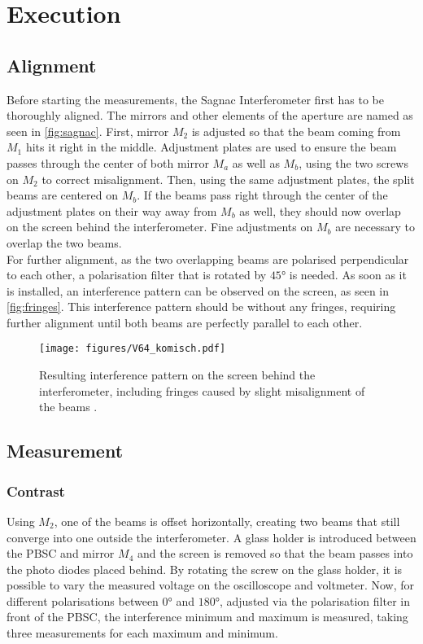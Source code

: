 \section{Execution}
\label{sec:execution}

\subsection{Alignment}
\label{subsec:alignment}

Before starting the measurements, the Sagnac Interferometer first has to be thoroughly aligned.
The mirrors and other elements of the aperture are named as seen in \autoref{fig:sagnac}.
First, mirror $M_2$ is adjusted so that the beam coming from $M_1$ hits it right in the middle.
Adjustment plates are used to ensure the beam passes through the center of both mirror $M_a$ as well as $M_b$, using the two screws on $M_2$ to correct misalignment.
Then, using the same adjustment plates, the split beams are centered on $M_b$.
If the beams pass right through the center of the adjustment plates on their way away from $M_b$ as well, they should now overlap on the screen behind the interferometer.
Fine adjustments on $M_b$ are necessary to overlap the two beams. \\
For further alignment, as the two overlapping beams are polarised perpendicular to each other, a polarisation filter that is rotated by $45°$ is needed.
As soon as it is installed, an interference pattern can be observed on the screen, as seen in \autoref{fig:fringes}.
This interference pattern should be without any fringes, requiring further alignment until both beams are perfectly parallel to each other.

\begin{figure}[H]
    \centering
    \texttt{[image: figures/V64\_komisch.pdf]}
    \caption{Resulting interference pattern on the screen behind the interferometer, including fringes caused by slight misalignment of the beams \cite{v64}.}
    \label{fig:fringes}
\end{figure}


\subsection{Measurement}
\label{subsec:measurement}

\subsubsection{Contrast}
\label{subsec:DurchführungKontras}
Using $M_2$, one of the beams is offset horizontally, creating two beams that still converge into one outside the interferometer.
A glass holder is introduced between the PBSC and mirror $M_4$ and the screen is removed so that the beam passes into the photo diodes placed behind.
By rotating the screw on the glass holder, it is possible to vary the measured voltage on the oscilloscope and voltmeter.
Now, for different polarisations between $0°$ and $180°$, adjusted via the polarisation filter in front of the PBSC, the interference minimum and maximum is measured,
taking three measurements for each maximum and minimum. \\

